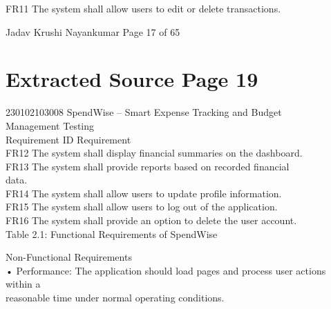\documentclass[12pt,a4paper]{report}
\begin{document}
\smallskip
FR11                      The system shall allow users to edit or delete transactions.\\ 

\smallskip

\smallskip

\smallskip

\smallskip
Jadav Krushi Nayankumar                                                           Page 17 of 65\\ 

\clearpage
\section*{Extracted Source Page 19}
230102103008                         SpendWise – Smart Expense Tracking and Budget\\ 
Management Testing\\ 

\smallskip
Requirement ID            Requirement\\ 

\smallskip
FR12                      The system shall display financial summaries on the dashboard.\\ 

\smallskip
FR13                      The system shall provide reports based on recorded financial\\ 
data.\\ 

\smallskip
FR14                      The system shall allow users to update profile information.\\ 

\smallskip
FR15                      The system shall allow users to log out of the application.\\ 

\smallskip
FR16                      The system shall provide an option to delete the user account.\\ 

\smallskip
Table 2.1: Functional Requirements of SpendWise\\ 

\smallskip

\smallskip

 Non-Functional Requirements\\ 

\smallskip
• Performance: The application should load pages and process user actions within a\\ 
reasonable time under normal operating conditions.\\ 
\end{document}
